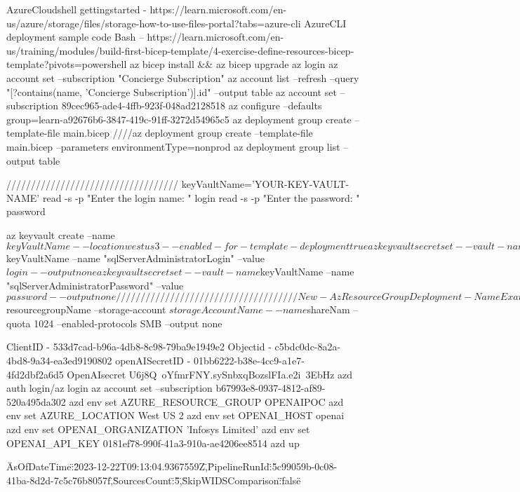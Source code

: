 


AzureCloudshell gettingstarted - https://learn.microsoft.com/en-us/azure/storage/files/storage-how-to-use-files-portal?tabs=azure-cli
AzureCLI deployment sample code Bash -- https://learn.microsoft.com/en-us/training/modules/build-first-bicep-template/4-exercise-define-resources-bicep-template?pivots=powershell
az bicep install && az bicep upgrade
az login
az account set --subscription "Concierge Subscription"
az account list --refresh --query "[?contains(name, 'Concierge Subscription')].id" --output table
az account set --subscription 89cec965-ade4-4ffb-923f-048ad2128518
az configure --defaults group=learn-a92676b6-3847-419c-91ff-3272d54965c5
az deployment group create --template-file main.bicep  ////az deployment group create --template-file main.bicep --parameters environmentType=nonprod
az deployment group list --output table

///////////////////////////////////
keyVaultName='YOUR-KEY-VAULT-NAME'
read -s -p "Enter the login name: " login
read -s -p "Enter the password: " password

az keyvault create --name $keyVaultName --location westus3 --enabled-for-template-deployment true
az keyvault secret set --vault-name $keyVaultName --name "sqlServerAdministratorLogin" --value $login --output none
az keyvault secret set --vault-name $keyVaultName --name "sqlServerAdministratorPassword" --value $password --output none

/////////////////////////////////////

New-AzResourceGroupDeployment -Name ExampleDeployment -ResourceGroupName OPENAIPOC -TemplateFile main.bicep

az storage share-rm create --resource-group $resourcegroupName --storage-account $storageAccountName --name $shareNam --quota 1024 --enabled-protocols SMB --output none

ClientID - 533d7cad-b96a-4db8-8c98-79ba9e1949e2
Objectid - c5bdc0dc-8a2a-4bd8-9a34-ea3ed9190802
openAISecretID - 01bb6222-b38e-4cc9-a1e7-4fd2dbf2a6d5
OpenAIsecret U6j8Q~oYfmrFNY.sySnbxqBozslFIa.e2i~3EbHz
azd auth login/az login
az account set --subscription b67993e8-0937-4812-af89-520a495da302
azd env set AZURE_RESOURCE_GROUP OPENAIPOC
azd env set AZURE_LOCATION West US 2
azd env set OPENAI_HOST openai
azd env set OPENAI_ORGANIZATION 'Infosys Limited'
azd env set OPENAI_API_KEY 0181ef78-990f-41a3-910a-ae4206ee8514
azd up


{\"AsOfDateTime\":\"2023-12-22T09:13:04.9367559Z\",\"PipelineRunId\":\"5c99059b-0c08-41ba-8d2d-7c5c76b8057f\",\"SourcesCount\":\"5\",\"SkipWIDSComparison\":\"false\"}